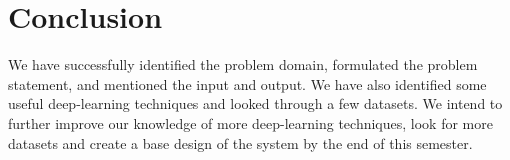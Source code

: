 \documentclass[twocolumn]{article}
\begin{document}
\section{Conclusion}
We have successfully identified the problem domain, formulated the problem statement, and mentioned the input and output. We have also identified some useful
deep-learning techniques and looked through a few datasets. We intend to further improve our knowledge of more deep-learning techniques, look for more datasets and
create a base design of the system by the end of this semester.


%
%
%
%
\end{document}
